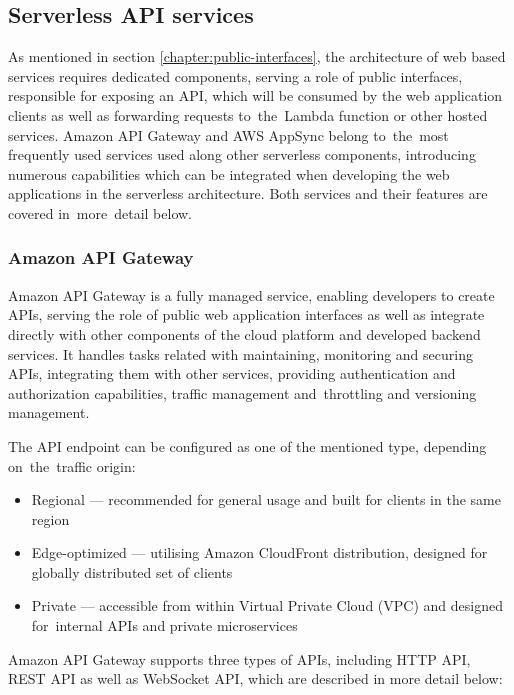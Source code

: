 \subsection{Serverless API services} \label{chapter:serverless-client-communication-patterns-for-serverless-architecture}

As mentioned in section \ref{chapter:public-interfaces}, the architecture of web based services requires dedicated components, serving a role of public interfaces, responsible for exposing an API, which will be consumed by the web application clients as well as forwarding requests to~the~Lambda function or other hosted services.
Amazon API Gateway and AWS AppSync belong to~the~most frequently used services used along other serverless components, introducing numerous capabilities which can be integrated when developing the web applications in the serverless architecture.
Both services and their features are covered in~more~detail below.

\subsubsection{Amazon API Gateway}

Amazon API Gateway \cite{ApiGateway} is a fully managed service, enabling developers to create APIs, serving the role of public web application interfaces as well as integrate directly with other components of the cloud platform and developed backend services.
It handles tasks related with maintaining, monitoring and securing APIs, integrating them with other services, providing authentication and authorization capabilities, traffic management and~throttling and versioning management.

The API endpoint can be configured as one of the mentioned type, depending on~the~traffic origin:

\begin{itemize}
   \item Regional --- recommended for general usage and built for clients in the same region
   \item Edge-optimized --- utilising Amazon CloudFront distribution, designed for globally distributed set of clients
   \item Private --- accessible from within Virtual Private Cloud (VPC) and designed for~internal APIs and private microservices
\end{itemize}

Amazon API Gateway supports three types of APIs, including HTTP API, REST API as well as WebSocket API, which are described in more detail below:

